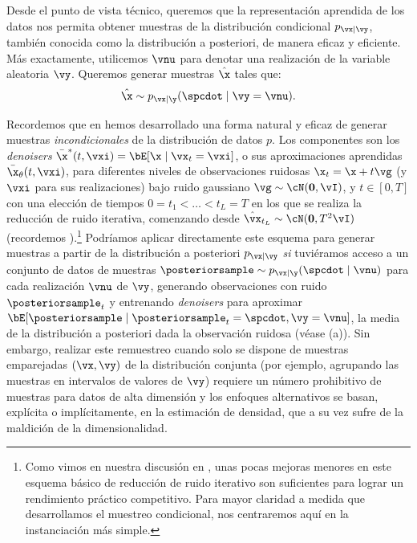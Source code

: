\documentclass[../../book-main_es.tex]{subfiles}
\begin{document}
Desde el punto de vista técnico, queremos que la representación aprendida de los datos
nos permita obtener muestras de la distribución condicional $p_{\vx\mid
\vy}$, también conocida como la distribución a posteriori, de manera eficaz y eficiente. Más exactamente,
utilicemos $\vnu$ para denotar una realización de la variable aleatoria $\vy$.
Queremos generar muestras $\hat{\x}$ tales que:
\begin{equation}\label{eq:goal-sample-posterior}
    \hat{\x} \sim   p_{\vx \mid \y}(\spcdot \mid \vy=\vnu).
\end{equation}

Recordemos que en  hemos desarrollado una forma natural y
eficaz de generar muestras \textit{incondicionales} de la distribución de datos
$p$. Los componentes son los \textit{denoisers} $\bar{\x}^\ast(t, \vxi) = \bE[ \x \mid
\vx_t=\vxi ]$, o sus aproximaciones aprendidas $\bar{\x}_{\theta}(t, \vxi)$,
para diferentes niveles de observaciones ruidosas $\x_t = \x + t \vg$ (y $\vxi$ para
sus realizaciones) bajo
ruido gaussiano $\vg \sim \cN(\mathbf{0}, \vI)$, y $t \in
[0, T]$ con una elección de tiempos $0 = t_1 < \dots < t_{L} = T$ en los que
se realiza la reducción de ruido iterativa, comenzando desde $\hat{\vx}_{t_L} \sim
\cN(\mathbf{0}, T^2 \vI)$ (recordemos
).\footnote{Como 
    vimos en nuestra discusión en , unas pocas mejoras menores
    en este esquema básico de reducción de ruido iterativo son
    suficientes para lograr un rendimiento práctico competitivo. Para
    mayor claridad a medida que desarrollamos
el muestreo condicional, nos centraremos aquí en la instanciación más simple.}
Podríamos aplicar directamente este esquema para generar muestras a partir de la distribución a posteriori
$p_{\vx \mid \vy}$ \textit{si} tuviéramos acceso a un conjunto de datos de muestras
$\posteriorsample \sim p_{\vx \mid \y}(\spcdot \mid \vnu)$ para cada realización
$\vnu$ de $\vy$, generando observaciones con ruido
$\posteriorsample_t$ y entrenando \textit{denoisers} para aproximar $\bE[
\posteriorsample \mid \posteriorsample_t=\spcdot, \vy=\vnu ]$, la
media de la distribución a posteriori dada
la observación ruidosa (véase (a)).
Sin embargo, realizar este remuestreo cuando solo se dispone de muestras emparejadas $(\vx, \vy)$ 
de la distribución conjunta (por ejemplo, agrupando las muestras en intervalos de valores de $\vy$) requiere
un número prohibitivo de muestras para datos de alta dimensión y los enfoques alternativos
se basan, explícita o implícitamente, en la estimación de densidad, que a su vez
sufre de la maldición de la dimensionalidad.
\end{document}
